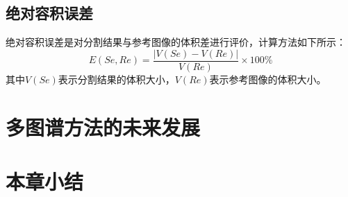 \subsection{绝对容积误差}
绝对容积误差是对分割结果与参考图像的体积差进行评价，计算方法如下所示：
\begin{equation}
  E(Se,Re)=\frac{\lvert V(Se)-V(Re)\rvert}{V(Re)}\times 100\%
\end{equation}
其中$V(Se)$表示分割结果的体积大小，$V(Re)$表示参考图像的体积大小。

\section{多图谱方法的未来发展}

\section{本章小结}
